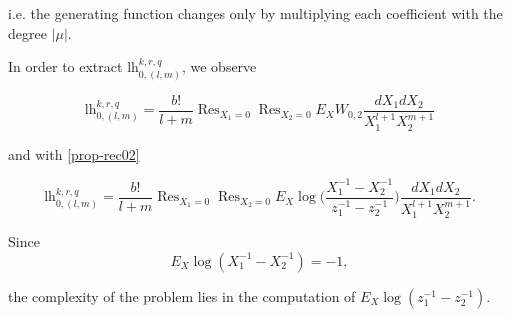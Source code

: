 \documentclass[10pt,a4paper,oneside,no-math,reqno]{amsart}%
\theoremstyle{plain}
\theoremstyle{definition}
\theoremstyle{remark}
\numberwithin{equation}{section}
\newcommand{\1}{\mathds{1}}
\newcommand{\<}{\langle}
\renewcommand{\>}{\rangle}
\DeclareMathOperator*{\Res}{Res}
\newcommand{\lh}{\mathord{\mathrm{l\!h}}}
\begin{document}
i.e. the generating function changes only by multiplying each coefficient with the degree $|\mu|$.

In order to extract $\lh_{0,(l,m)}^{k,r,q}$, we observe

\begin{equation}
    \lh_{0,(l,m)}^{k,r,q}
    =
    \frac{b!}{l+m}\Res_{X_1=0} \Res_{X_2=0} E_X W_{0,2} \frac{dX_1 dX_2}{X_1^{l+1} X_2^{m+1}}
\end{equation}

and with \cref{prop-rec02}

\begin{equation}
    \lh_{0,(l,m)}^{k,r,q}
    =
    \frac{b!}{l+m} \Res_{X_1=0} \Res_{X_2=0} E_X \log \big( \frac{X_1^{-1} - X_2^{-1}}{z_1^{-1} - z_2^{-1}} \big) \frac{dX_1 dX_2}{X_1^{l+1} X_2^{m+1}} .
\end{equation}

Since
\begin{equation}
    E_X \log (X_1^{-1} - X_2^{-1})
    =
    -1,
\end{equation}

the complexity of the problem lies in the computation of $E_X \log (z_1^{-1} - z_2^{-1})$. 
\end{document}
